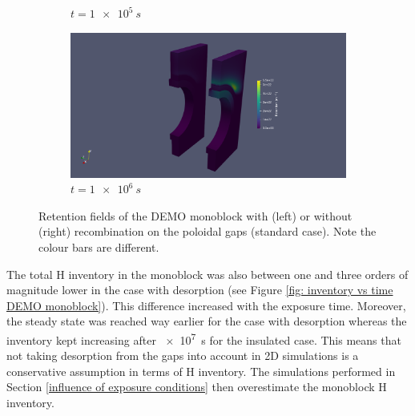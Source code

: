 \begin{figure} [h]
\begin{subfigure}{0.45\linewidth}
        \caption{$t=\SI{1e5}{s}$}
    \end{subfigure}%
    \qquad
    \begin{subfigure}{0.45\linewidth}
        \centering
        \includegraphics[trim=500 0 300 0, clip, width=\linewidth]{Figures/Chapter3/monoblocks/3D_monoblocks/retention_1e6s.png}
        \caption{$t=\SI{1e6}{s}$}
    \end{subfigure}
    \caption{Retention fields of the DEMO monoblock with (left) or without (right) recombination on the poloidal gaps (standard case). Note the colour bars are different.}
    \label{fig:retention fields 3D monoblocks}
\end{figure}

The total H inventory in the monoblock was also between one and three orders of magnitude lower in the case with desorption (see Figure \ref{fig: inventory vs time DEMO monoblock}).
This difference increased with the exposure time.
Moreover, the steady state was reached way earlier for the case with desorption whereas the inventory kept increasing after \SI{e7}{s} for the insulated case.
This means that not taking desorption from the gaps into account in 2D simulations is a conservative assumption in terms of H inventory.
The simulations performed in Section \ref{influence of exposure conditions} then overestimate the monoblock H inventory.

